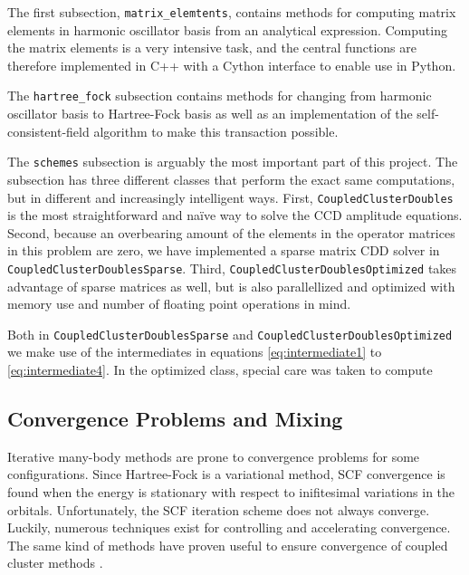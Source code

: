 \documentclass[
    a4paper, aps, twocolumn, floatfix, superscriptaddress,
    nofootinbib]{revtex4-1}
\newcommand{\1}{\mathds{1}}
\begin{document}
        The first subsection, \texttt{matrix_elemtents},
        contains methods for computing matrix elements in harmonic
        oscillator basis from an analytical
        expression\cite{anisimovas1998energy}.  Computing the matrix
        elements is a very intensive task, and the central functions are
        therefore implemented in C++ with a Cython interface to enable use
        in Python.

        The \texttt{hartree_fock} subsection contains methods
        for changing from harmonic oscillator basis to Hartree-Fock basis as
        well as an implementation of the self-consistent-field algorithm to
        make this transaction possible.

        The \texttt{schemes} subsection is arguably the most
        important part of this project. The subsection has three different
        classes that perform the exact same computations, but in different
        and increasingly intelligent ways. First,
        \texttt{CoupledClusterDoubles} is the most
        straightforward and naïve way to solve the CCD amplitude equations.
        Second, because an overbearing amount of the elements in the
        operator matrices in this problem are zero, we have implemented a
        sparse matrix CDD solver in
        \texttt{CoupledClusterDoublesSparse}. Third,
        \texttt{CoupledClusterDoublesOptimized} takes advantage
        of sparse matrices as well, but is also parallellized and optimized
        with memory use and number of floating point operations in mind.

        Both in \texttt{CoupledClusterDoublesSparse} and
        \texttt{CoupledClusterDoublesOptimized} we make use
        of the intermediates in equations \ref{eq:intermediate1} to
        \ref{eq:intermediate4}. In the optimized class, special care was
        taken to compute

    \subsection{Convergence Problems and Mixing}

        Iterative many-body methods are prone to convergence problems for some
        configurations. Since Hartree-Fock is a variational method, SCF convergence
        is found when the energy is stationary with respect to inifitesimal 
        variations in the orbitals. Unfortunately, the SCF iteration scheme does 
        not always converge. Luckily, numerous techniques exist for controlling
        and accelerating convergence\cite{schlegel1991you}. The same kind of 
        methods have proven useful to ensure convergence of coupled cluster methods
        \cite{scuseria1986accelerating}.
\end{document}
